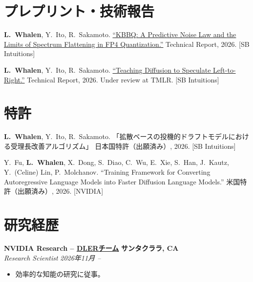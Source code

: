 \documentclass[10pt,a4paper]{article}
\newcommand{\cvlink}[2]{\href{#1}{#2}}
\newcommand{\entry}[4]{%
  \noindent\textbf{#1} \hfill \textbf{#2}\\
  \textit{#3} \hfill \textit{#4}%
}
\begin{document}
\section{プレプリント・技術報告}
\begin{publist}
  \item \textbf{L.\ Whalen}, Y.\ Ito, R.\ Sakamoto. \href{https://arxiv.org/pdf/2609.08135}{``KBBQ: A Predictive Noise Law and the Limits of Spectrum Flattening in FP4 Quantization.''} Technical Report, 2026. [SB Intuitions]
  \item \textbf{L.\ Whalen}, Y.\ Ito, R.\ Sakamoto. \href{https://arxiv.org/pdf/2606.11552}{``Teaching Diffusion to Speculate Left-to-Right.''} Technical Report, 2026. Under review at TMLR. [SB Intuitions]
\end{publist}

\section{特許}
\begin{publist}
  \item \textbf{L.\ Whalen}, Y.\ Ito, R.\ Sakamoto. 「拡散ベースの投機的ドラフトモデルにおける受理長改善アルゴリズム」 日本国特許（出願済み）, 2026. [SB Intuitions]
  \item Y.\ Fu, \textbf{L.\ Whalen}, X.\ Dong, S.\ Diao, C.\ Wu, E.\ Xie, S.\ Han, J.\ Kautz, Y.\ (Celine) Lin, P.\ Molchanov. ``Training Framework for Converting Autoregressive Language Models into Faster Diffusion Language Models.'' 米国特許（出願済み）, 2026. [NVIDIA]
\end{publist}

\section{研究経歴}

\entry{NVIDIA Research -- \cvlink{https://nv-dler.github.io/}{DLERチーム}}{サンタクララ, CA}{Research Scientist}{2026年11月 --}
\begin{itemize}[leftmargin=*, nosep, itemsep=2pt, topsep=2pt]
  \item 効率的な知能の研究に従事。
\end{itemize}
\end{document}
